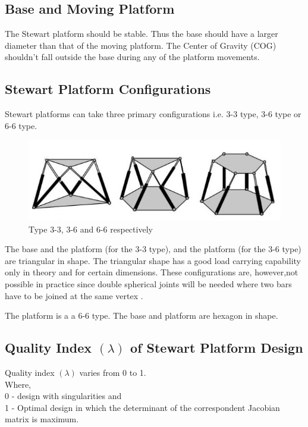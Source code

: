 \subsection{Base and Moving Platform}
 The Stewart platform should be stable. Thus the base should have a larger diameter than that of the moving platform. The Center of Gravity (COG) shouldn't fall outside the base during any of the platform movements.
 \subsection{Stewart Platform Configurations}
Stewart platforms can take three primary configurations i.e. 3-3 type, 3-6 type or 6-6 type.
\begin{center}
	\begin{figure}[H]
	\centering
	\includegraphics{Figures/stewart}
	\caption[Configurations]{Type 3-3, 3-6 and 6-6 respectively
	\cite{fernandes_design_nodate}}
	\end{figure}
\end{center}
The base and the platform (for the 3-3 type), and the platform (for the 3-6 type) are triangular in shape. The triangular shape has a good load carrying capability only in theory and for certain dimensions. These configurations are, however,not possible in practice since double spherical joints will be needed where two bars have to be joined at the same vertex
\cite{fernandes_design_nodate}.

The platform is a a 6-6 type. The base and platform are hexagon in shape.

\subsection{Quality Index $(\lambda)$ of Stewart Platform Design}
Quality index $(\lambda)$ varies from 0 to 1.\\
Where,\\
0 - design with singularities and\\
1 - Optimal design in which the determinant of the correspondent Jacobian matrix is maximum.

